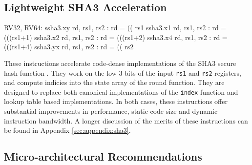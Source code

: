 

\subsection{Lightweight SHA3 Acceleration}

\begin{isa}
RV32, RV64:
    ssha3.xy rd, rs1, rs2 : rd = (( rs1    %
    ssha3.x1 rd, rs1, rs2 : rd = (((rs1+1) %
    ssha3.x2 rd, rs1, rs2 : rd = (((rs1+2) %
    ssha3.x4 rd, rs1, rs2 : rd = (((rs1+4) %
    ssha3.yx rd, rs1, rs2 : rd = (( rs2    %
\end{isa}

These instructions accelerate code-dense implementations of the SHA3 secure
hash function \cite{nist:fips:202}.
They work on the low $3$ bits of the input {\tt rs1} and {\tt rs2} registers,
and compute indicies into the state array of the round function.
They are designed to replace both canonical implementations of the
{\tt index} function and lookup table based implementations.
In both cases, these instructions offer substantial
improvements in performance, static code size and dynamic instruction
bandwidth.
A longer discussion of the merits of these instructions can
be found in Appendix \ref{sec:appendix:sha3}.


\subsection{Micro-architectural Recommendations}



